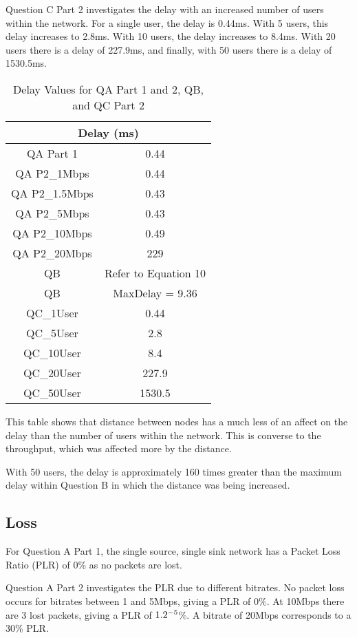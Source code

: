 \par Question C Part 2 investigates the delay with an increased number of
users within the network. For a single user, the delay is 0.44ms. With 5 users,
this delay increases to 2.8ms. With 10 users, the delay increases to 8.4ms. With
20 users there is a delay of 227.9ms, and finally, with 50 users there is a
delay of 1530.5ms.

\begin{table}[H]
	\centering
	\caption{Delay Values for QA Part 1 and 2, QB, and QC Part 2}
	\label{tab:P2Delay}
	\begin{tabular}{|c|c|}
		\hline
		\multicolumn{2}{|c|}{Delay (ms)} \\
		\hline
		QA Part 1 & 0.44 \\
		QA P2_{1Mbps} & 0.44\\
		QA P2_{1.5Mbps} & 0.43\\
		QA P2_{5Mbps} & 0.43\\
		QA P2_{10Mbps} & 0.49\\
		QA P2_{20Mbps} & 229\\
		QB & Refer to Equation 10 \\
		QB & MaxDelay = 9.36 \\
		QC_{1User} & 0.44\\
		QC_{5User} & 2.8\\
		QC_{10User} & 8.4\\
		QC_{20User} & 227.9\\
		QC_{50User} & 1530.5\\
		\hline
	\end{tabular}
\end{table}

This table shows that distance between nodes has a much less of an affect
on the delay than the number of users within the network. This is converse to
the throughput, which was affected more by the distance.

\par With 50 users, the delay is approximately 160 times greater than the
maximum delay within Question B in which the distance was being increased.

\subsection{Loss}

For Question A Part 1, the single source, single sink network has a Packet Loss
Ratio (PLR) of 0\% as no packets are lost.

\par Question A Part 2 investigates the PLR due to different bitrates.
No packet loss occurs for bitrates between 1 and 5Mbps, giving a PLR of 0\%. At
10Mbps there are 3 lost packets, giving a PLR of $1.2\time10^{-5}$\%. A bitrate
of 20Mbps corresponds to a 30\% PLR.

